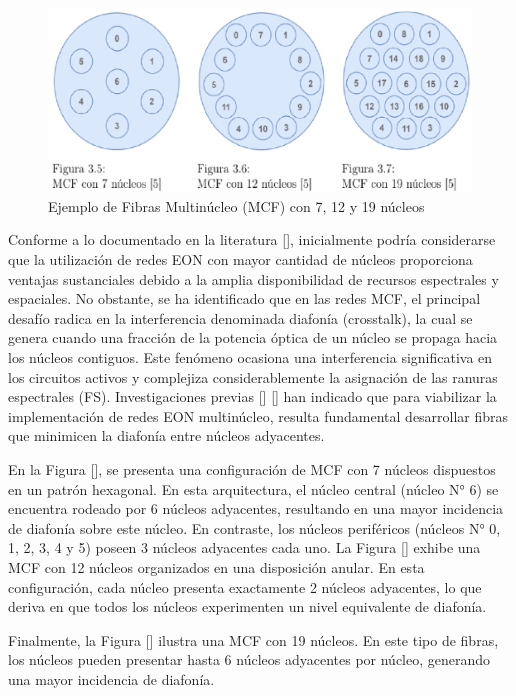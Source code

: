 \begin{figure}[H]
    \centering
    \includegraphics[width=1\textwidth]{capitulos/img/MCF_NUCLEOS.png}
    \caption{Ejemplo de Fibras Multinúcleo (MCF) con 7, 12 y 19 núcleos}
    \label{fig:MCF_NUCLEOS}
\end{figure}
%

Conforme a lo documentado en la literatura [], inicialmente podría considerarse que la utilización de redes EON con mayor cantidad de núcleos proporciona ventajas sustanciales debido a la amplia disponibilidad de recursos espectrales y espaciales. No obstante, se ha identificado que en las redes MCF, el principal desafío radica en la interferencia denominada diafonía (crosstalk), la cual se genera cuando una fracción de la potencia óptica de un núcleo se propaga hacia los núcleos contiguos.
 Este fenómeno ocasiona una interferencia significativa en los circuitos activos y complejiza considerablemente la asignación de las ranuras espectrales (FS). Investigaciones previas [] [] han indicado que para viabilizar la implementación de redes EON multinúcleo, resulta fundamental desarrollar fibras que minimicen la diafonía entre núcleos adyacentes.
%

 En la Figura [], se presenta una configuración de MCF con 7 núcleos dispuestos en un patrón hexagonal. En esta arquitectura, el núcleo central (núcleo N° 6) se encuentra rodeado por 6 núcleos adyacentes, resultando en una mayor incidencia de diafonía sobre este núcleo.
 En contraste, los núcleos periféricos (núcleos N° 0, 1, 2, 3, 4 y 5) poseen 3 núcleos adyacentes cada uno. La Figura [] exhibe una MCF con 12 núcleos organizados en una disposición anular. En esta configuración, cada núcleo presenta exactamente 2 núcleos adyacentes, lo que deriva en que todos los núcleos experimenten un nivel equivalente de diafonía.

 Finalmente, la Figura [] ilustra una MCF con 19 núcleos. En este tipo de fibras, los núcleos pueden presentar hasta 6 núcleos adyacentes por núcleo, generando una mayor incidencia de diafonía.
%


